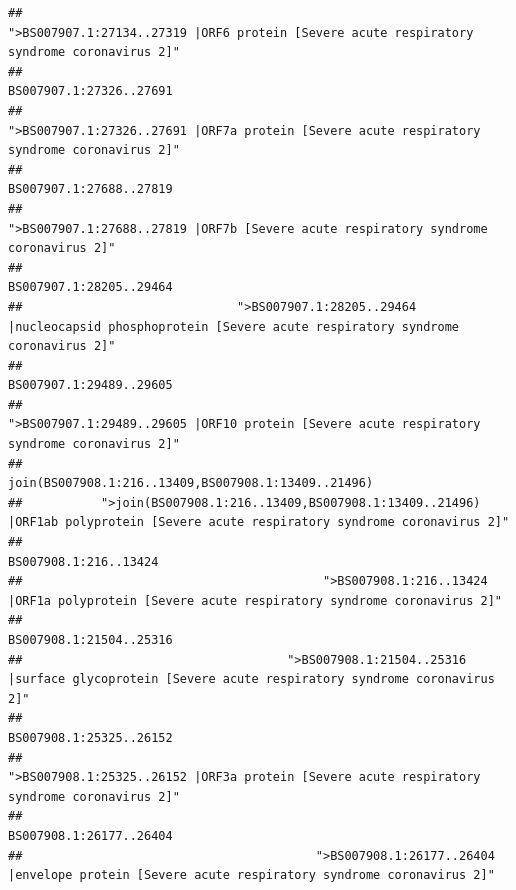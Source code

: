 \documentclass[
]{article}
\begin{document}
\begin{verbatim}
##                                             ">BS007907.1:27134..27319 |ORF6 protein [Severe acute respiratory syndrome coronavirus 2]" 
##                                                                                                                BS007907.1:27326..27691 
##                                            ">BS007907.1:27326..27691 |ORF7a protein [Severe acute respiratory syndrome coronavirus 2]" 
##                                                                                                                BS007907.1:27688..27819 
##                                                    ">BS007907.1:27688..27819 |ORF7b [Severe acute respiratory syndrome coronavirus 2]" 
##                                                                                                                BS007907.1:28205..29464 
##                              ">BS007907.1:28205..29464 |nucleocapsid phosphoprotein [Severe acute respiratory syndrome coronavirus 2]" 
##                                                                                                                BS007907.1:29489..29605 
##                                            ">BS007907.1:29489..29605 |ORF10 protein [Severe acute respiratory syndrome coronavirus 2]" 
##                                                                                    join(BS007908.1:216..13409,BS007908.1:13409..21496) 
##           ">join(BS007908.1:216..13409,BS007908.1:13409..21496) |ORF1ab polyprotein [Severe acute respiratory syndrome coronavirus 2]" 
##                                                                                                                  BS007908.1:216..13424 
##                                          ">BS007908.1:216..13424 |ORF1a polyprotein [Severe acute respiratory syndrome coronavirus 2]" 
##                                                                                                                BS007908.1:21504..25316 
##                                     ">BS007908.1:21504..25316 |surface glycoprotein [Severe acute respiratory syndrome coronavirus 2]" 
##                                                                                                                BS007908.1:25325..26152 
##                                            ">BS007908.1:25325..26152 |ORF3a protein [Severe acute respiratory syndrome coronavirus 2]" 
##                                                                                                                BS007908.1:26177..26404 
##                                         ">BS007908.1:26177..26404 |envelope protein [Severe acute respiratory syndrome coronavirus 2]" 

\end{verbatim}
\end{document}
